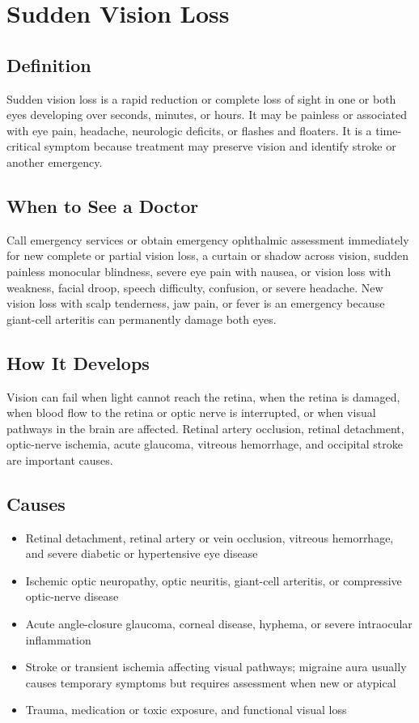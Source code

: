 \chapter{Sudden Vision Loss}

\section*{Definition}
Sudden vision loss is a rapid reduction or complete loss of sight in one or both eyes developing over seconds, minutes, or hours. It may be painless or associated with eye pain, headache, neurologic deficits, or flashes and floaters. It is a time-critical symptom because treatment may preserve vision and identify stroke or another emergency.

\section*{When to See a Doctor}
Call emergency services or obtain emergency ophthalmic assessment immediately for new complete or partial vision loss, a curtain or shadow across vision, sudden painless monocular blindness, severe eye pain with nausea, or vision loss with weakness, facial droop, speech difficulty, confusion, or severe headache. New vision loss with scalp tenderness, jaw pain, or fever is an emergency because giant-cell arteritis can permanently damage both eyes.

\section*{How It Develops}
Vision can fail when light cannot reach the retina, when the retina is damaged, when blood flow to the retina or optic nerve is interrupted, or when visual pathways in the brain are affected. Retinal artery occlusion, retinal detachment, optic-nerve ischemia, acute glaucoma, vitreous hemorrhage, and occipital stroke are important causes.

\section*{Causes}
\begin{itemize}
  \item Retinal detachment, retinal artery or vein occlusion, vitreous hemorrhage, and severe diabetic or hypertensive eye disease
  \item Ischemic optic neuropathy, optic neuritis, giant-cell arteritis, or compressive optic-nerve disease
  \item Acute angle-closure glaucoma, corneal disease, hyphema, or severe intraocular inflammation
  \item Stroke or transient ischemia affecting visual pathways; migraine aura usually causes temporary symptoms but requires assessment when new or atypical
  \item Trauma, medication or toxic exposure, and functional visual loss
\end{itemize}


